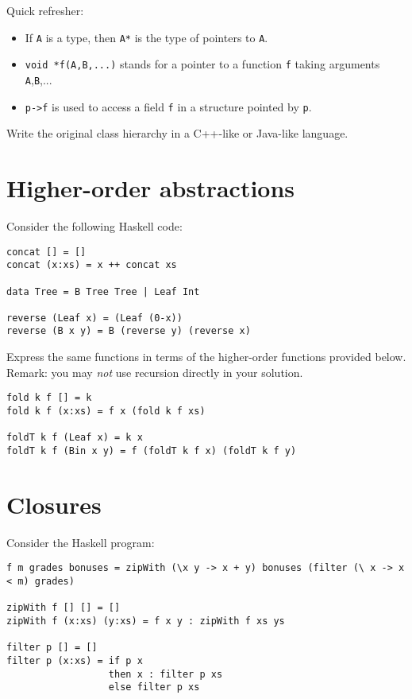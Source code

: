 \documentclass{article}
\begin{document}
Quick refresher:
\begin{itemize}
\item If \texttt{A} is a type, then \texttt{A*} is the type of
  pointers to \texttt{A}.
\item \texttt{void *f(A,B,...)} stands for a pointer to a function
  \texttt{f} taking arguments \texttt{A},\texttt{B},...
\item \texttt{p->f} is used to access a field \texttt{f} in a
  structure pointed by \texttt{p}.
\end{itemize}

Write the original class hierarchy in a C++-like or Java-like language.


\newpage
\section{Higher-order abstractions}

Consider the following Haskell code:
\begin{verbatim}
concat [] = []
concat (x:xs) = x ++ concat xs

data Tree = B Tree Tree | Leaf Int

reverse (Leaf x) = (Leaf (0-x))
reverse (B x y) = B (reverse y) (reverse x)
\end{verbatim}

Express the same functions in terms of the higher-order functions
provided below.  Remark: you may \emph{not} use recursion directly in
your solution.

\begin{verbatim}
fold k f [] = k
fold k f (x:xs) = f x (fold k f xs)

foldT k f (Leaf x) = k x
foldT k f (Bin x y) = f (foldT k f x) (foldT k f y)
\end{verbatim}

\section{Closures}

Consider the Haskell program:
\begin{verbatim}
f m grades bonuses = zipWith (\x y -> x + y) bonuses (filter (\ x -> x < m) grades)

zipWith f [] [] = []
zipWith f (x:xs) (y:xs) = f x y : zipWith f xs ys

filter p [] = []
filter p (x:xs) = if p x
                  then x : filter p xs
                  else filter p xs
\end{verbatim}
\end{document}
